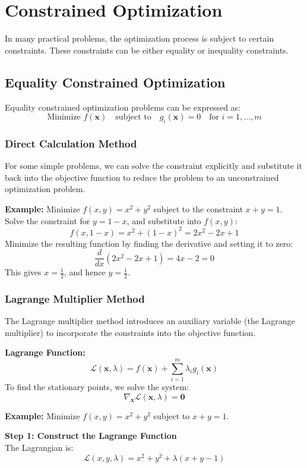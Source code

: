 \documentclass[]{article}
\begin{document}
	\section{Constrained Optimization}
	In many practical problems, the optimization process is subject to certain constraints.
	These constraints can be either equality or inequality constraints.
	
	\subsection{Equality Constrained Optimization}
	Equality constrained optimization problems can be expressed as:
	$$
	\text{Minimize } f(\mathbf{x})
	\quad
	\text{subject to}
	\quad
	g_i(\mathbf{x}) = 0
	\quad
	\text{for } i = 1, \dots, m
	$$
	
	\subsubsection{Direct Calculation Method}
	For some simple problems, we can solve the constraint explicitly and substitute it back into the objective function to reduce the problem to an unconstrained optimization problem.
	
	\textbf{Example:}
	Minimize $f(x, y) = x^2 + y^2$ subject to the constraint $x + y = 1$.
	\\
	Solve the constraint for $y = 1 - x$, and substitute into $f(x, y)$:
	$$
	f(x, 1-x) = x^2 + (1-x)^2 = 2x^2 - 2x + 1
	$$
	Minimize the resulting function by finding the derivative and setting it to zero:
	$$
	\frac{d}{dx}(2x^2 - 2x + 1) = 4x - 2 = 0
	$$
	This gives $x = \frac{1}{2}$, and hence $y = \frac{1}{2}$.
	
	\subsubsection{Lagrange Multiplier Method}
	The Lagrange multiplier method introduces an auxiliary variable (the Lagrange multiplier) to incorporate the constraints into the objective function.
	
	\textbf{Lagrange Function:}
	$$
	\mathcal{L}(\mathbf{x}, \lambda) = f(\mathbf{x}) + \sum_{i=1}^m \lambda_i g_i(\mathbf{x})
	$$
	To find the stationary points, we solve the system:
	$$
	\nabla_\mathbf{x} \mathcal{L}(\mathbf{x}, \lambda) = \mathbf{0}
	$$
	
	\textbf{Example:}
	Minimize $f(x, y) = x^2 + y^2$ subject to $x + y = 1$.

	\textbf{Step 1: Construct the Lagrange Function}\\
	The Lagrangian is:
	$$
	\mathcal{L}(x, y, \lambda) = x^2 + y^2 + \lambda (x + y - 1)
	$$
	
\end{document}
